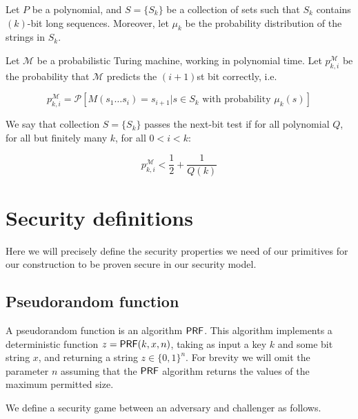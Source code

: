\documentclass{article}
\begin{document}
Let $P$ be a polynomial, and $S=\{S_k\}$ be a collection of sets such that $S_k$ contains $(k)$-bit long sequences. Moreover, let $\mu_k$ be the probability distribution of the strings in $S_k$.

Let $\mathcal{M}$ be a probabilistic Turing machine, working in polynomial time. Let $p_{k,i}^{\mathcal{M}}$ be the probability that $\mathcal{M}$ predicts the $(i+1)$st bit correctly, i.e.

$$p_{k,i}^{\mathcal{M}}={\mathcal{P}}[M(s_1\ldots s_i)=s_{i+1} | s\in S_k\text{ with probability }\mu_k(s)]$$

We say that collection $S = \{ S_k \}$ passes the next-bit test if for all polynomial $Q$, for all but finitely many $k$, for all $0 < i < k$: 

$$
p_{k,i}^{\mathcal M}<\frac{1}{2}+\frac{1}{Q(k)}
$$

\section{Security definitions} \label{sec:def}

Here we will precisely define the security properties we need of our primitives for our construction to be proven secure in our security model.

\subsection{Pseudorandom function} \label{PRFdef}


A pseudorandom function is an algorithm $\mathsf{PRF}$. This algorithm implements a deterministic function $z=\mathsf{PRF}(k, x, n)$, taking as input a key $k$ and some bit string $x$, and returning a string $z \in \{0, 1 \}^{n}$. For brevity we will omit the parameter $n$ assuming that the $\mathsf{PRF}$ algorithm returns the values of the maximum permitted size.

We define a security game between an adversary and challenger as follows.
\end{document}
